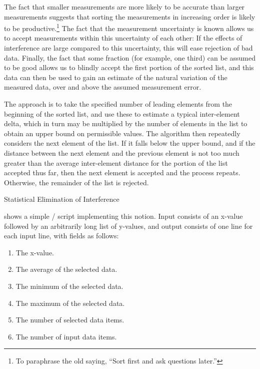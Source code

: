 The fact that smaller measurements are more likely to be accurate than
larger measurements suggests that sorting the measurements in increasing
order is likely to be productive.\footnote{
	To paraphrase the old saying, ``Sort first and ask questions later.''}
The fact that the measurement uncertainty is known allows us to accept
measurements within this uncertainty of each other:
If the effects of interference are large compared to this uncertainty,
this will ease rejection of bad data.
Finally, the fact that some fraction (for example, one third) can be
assumed to be good allows us to blindly accept the first portion of the
sorted list, and this data can then be used to gain an estimate of the
natural variation of the measured data, over and above the assumed
measurement error.

The approach is to take the specified number of leading elements from the
beginning of the sorted list, and use these to estimate a typical
inter-element delta, which in turn may be multiplied by the number of
elements in the list to obtain an upper bound on permissible values.
The algorithm then repeatedly considers the next element of the list.
If it falls below the upper bound, and if the distance between
the next element and the previous element is not too much greater than
the average inter-element distance for the portion of the list accepted
thus far, then the next element is accepted and the process repeats.
Otherwise, the remainder of the list is rejected.

\begin{listing}

\caption{Statistical Elimination of Interference}
\label{lst:debugging:Statistical Elimination of Interference}
\end{listing}

shows a simple / script implementing this notion.
Input consists of an x-value followed by an arbitrarily long list of y-values,
and output consists of one line for each input line, with fields as follows:

\begin{enumerate}
\item	The x-value.
\item	The average of the selected data.
\item	The minimum of the selected data.
\item	The maximum of the selected data.
\item	The number of selected data items.
\item	The number of input data items.
\end{enumerate}

